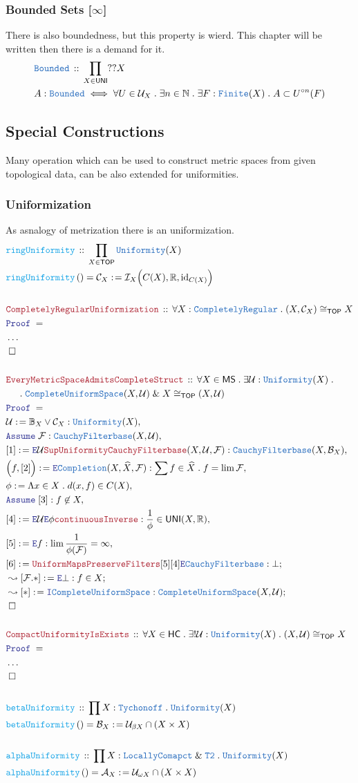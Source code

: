 \documentclass[12pt]{scrartcl}
\newcommand{\TYPE}[1]{\textcolor{NavyBlue}{\mathtt{#1}}}
\newcommand{\FUNC}[1]{\textcolor{Cerulean}{\mathtt{#1}}}
\newcommand{\LOGIC}[1]{\textcolor{Blue}{\mathtt{#1}}}
\newcommand{\THM}[1]{\textcolor{Maroon}{\mathtt{#1}}}
\renewcommand{\.}{\; . \;}
\newcommand{\de}{: \kern 0.1pc =}
\newcommand{\Act}[1]{\left( #1 \right)}
\newcommand{\Theorem}[2]{& \THM{#1} \, :: \, #2 \\ & \Proof = \\ }
\newcommand{\DeclareType}[2]{& \TYPE{#1} \, :: \, #2 \\}
\newcommand{\DefineType}[3]{& #1 : \TYPE{#2} \iff #3 \\}
\newcommand{\DeclareFunc}[2]{& \FUNC{#1} \, :: \, #2 \\}
\newcommand{\DefineNamedFunc}[4]{&  \FUNC{#1}\Act{#2} = #3 \de #4 \\}
\newcommand{\NewLine}{\\ & \kern 1pc}
\newcommand{\Page}[1]{ \begin{align*} #1 \end{align*}   }
\newcommand{\NoProof}{ & \ldots \\ \EndProof}
\renewcommand{\And}{\; \& \;}
\newcommand{\Reals}{\mathbb{R} }
\newcommand{\Nat}{\mathbb{N} }
\DeclareMathOperator*{\id}{id}
\newcommand{\Finite}{\TYPE{Finite}}
\newcommand{\Say}[3]{& #1 \de #2 : #3, \\}
\newcommand{\SayIn}[3]{& #1 \de #2 \in #3, \\}
\newcommand{\Conclude}[3]{& #1 \de #2 : #3; \\}
\newcommand{\DeriveConclude}[3]{& \leadsto #1 \de #2 : #3 ; \\}
\newcommand{\Assume}[2]{& \LOGIC{Assume} \; #1 : #2, \\}
\newcommand{\Intro}{\LOGIC{I}}
\newcommand{\Elim}{\LOGIC{E}}
\newcommand{\QED}{\; \square}
\newcommand{\EndProof}{& \QED \\}
\newcommand{\Proof}{\LOGIC{Proof} \; }
\renewcommand{\C}{\mathcal{C}}
\newcommand{\A}{\mathcal{A}}
\newcommand{\B}{\mathcal{B}}
\newcommand{\I}{\mathcal{I}}
\newcommand{\CR}{\TYPE{CompletelyRegular}}
\newcommand{\TOP}{\mathsf{TOP}}
\newcommand{\HC}{\mathsf{HC}}
\renewcommand{\U}{\mathcal{U}}
\newcommand{\F}{\mathcal{F}}
\newcommand{\Cell}{\mathbb{B}}
\newcommand{\MS}{\mathsf{MS}}
\newcommand{\UNI}{\mathsf{UNI}}
\newcommand{\Unif}{\TYPE{Uniformity}}
\newcommand{\CF}{\TYPE{CauchyFilterbase}}
\newcommand{\CUS}{\TYPE{CompleteUniformSpace}}
\begin{document}
\subsubsection{Bounded Sets [$\infty$]}
There is also boundedness, but this property is wierd.
This chapter will be written then there is a demand for it.
\Page{
	\DeclareType{Bounded}{\prod_{X \in \UNI} ??X}
	\DefineType{A}{Bounded}
	{
		\forall U \in \U_X \. 
		\exists n \in \Nat \.
		\exists F : \Finite(X) \.
		A \subset U^{\circ n}(F)
	}
}
\newpage
\subsection{Special Constructions}
Many operation which can be used to construct metric spaces 
from given topological data, can be also extended for uniformities.
\subsubsection{Uniformization}
As asnalogy of metrization there is an uniformization.
\Page{
	\DeclareFunc{ringUniformity}
	{
		\prod_{X \in \TOP} \Unif(X)
	}
	\DefineNamedFunc{ringUniformity}{}{\C_X}
	{
		\I_X\Big( C(X), \Reals, {\id}_{C(X)}\Big)
	}
	\\
	\Theorem{CompletelyRegularUniformization}
	{
		\forall X : \CR \. (X,\C_X) \cong_\TOP X
	}
	\NoProof
	\\
	\Theorem{EveryMetricSpaceAdmitsCompleteStruct}
	{
		\forall X \in \MS \. 
		\exists \U : \Unif(X) \. \NewLine \.
		\CUS(X,\U) \And X \cong_\TOP (X,\U)
	}
	\Say{\U}{\Cell_X \vee \C_X}{\Unif(X)}
	\Assume{\F}{\CF(X,\U)}
	\Say{[1]}{\Elim \U \THM{SupUniformityCauchyFilterbase}(X,\U,\F)}
	{
		\CF(X,\B_X)
	}
	\Say{\Big(f, [2] \Big)}{\Elim \TYPE{Completion}(X,\widehat{X},\F)}
	{
		\sum f \in \widehat{X} \. f = \lim \F
	}
	\SayIn{\phi}{\Lambda x \in X \. d(x,f)}{C(X)}
	\Assume{[3]}{f \not \in X}
	\Say{[4]}{\Elim \U \Elim \phi \THM{continuousInverse}}
	{
		\frac{1}{\phi} \in \UNI(X,\Reals)
	}
	\Say{[5]}{\Elim f }{\lim \frac{1}{\phi(\F)} = \infty}
	\Conclude{[6]}{\THM{UniformMapsPreserveFilters}[5][4]\Elim \CF}
	{
		\bot
	}
	\DeriveConclude{[\F.*]}{\Elim \bot}{ f \in X}
	\DeriveConclude{[*]}{\Intro \CUS}{\CUS(X,\U)}
	\EndProof
	\\
	\Theorem{CompactUniformityIsExists}
	{
		\forall X \in \HC \.
		\exists! \U : \Unif(X) \.
		(X,\U) \cong_\TOP X 
	}
	\NoProof
	\\
	\DeclareFunc{betaUniformity}
	{
		\prod X : \TYPE{Tychonoff} \.
		\Unif(X)
	}
	\DefineNamedFunc{betaUniformity}
	{}{\B_X}{\U_{\beta X} \cap (X \times X) }
	\\
	\DeclareFunc{alphaUniformity}
	{
		\prod X : \TYPE{LocallyComapct} \And \TYPE{T2} \.
		\Unif(X)
	}
	\DefineNamedFunc{alphaUniformity}
	{}{\A_X}{\U_{\omega X} \cap (X \times X) }
}
\end{document}
